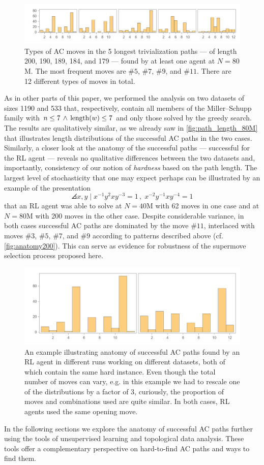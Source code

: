 \begin{figure}[h]
    \centering
	\includegraphics[scale=0.6]{fig/anatomy_some.png}
	\caption{Types of AC moves in the 5 longest trivialization paths --- of length 200, 190, 189, 184, and 179 --- found by at least one agent at $N=80$M. The most frequent moves are $\# 5$, $\# 7$, $\# 9$, and $\# 11$. There are 12 different types of moves in total.}
	\label{fig:anatomy_some}
\end{figure}

As in other parts of this paper, we performed the analysis on two datasets of sizes 1190 and 533 that, respectively, contain all members of the Miller–Schupp family with $n \leq 7 \, \land \, \operatorname{length}(w) \leq 7$ and only those solved by the greedy search. The results are qualitatively similar, as we already saw in \autoref{fig:path_length_80M} that illustrates length distributions of the successful AC paths in the two cases. Similarly, a closer look at the anatomy of the successful paths --- successful for the RL agent --- reveals no qualitative differences between the two datasets and, importantly, consistency of our notion of \textit{hardness} based on the path length. The largest level of stochasticity that one may expect perhaps can be illustrated by an example of the presentation
\[
\angles{x, y \mid x^{-1} y^2 x y^{-3} =1 \,, \; x^{-2} y^{-1} x y^{-4} =1 }
\]
that an RL agent was able to solve at $N=40$M with 62 moves in one case and at $N=80$M with 200 moves in the other case. Despite considerable variance, in both cases successful AC paths are dominated by the move $\# 11$, interlaced with moves $\# 3$, $\# 5$, $\# 7$, and $\# 9$ according to patterns described above (cf. \autoref{fig:anatomy200}). This can serve as evidence for robustness of the supermove selection process proposed here.

\begin{figure}[h]
    \centering
	\includegraphics[scale=0.55]{fig/anatomy200.png}
	\caption{An example illustrating anatomy of successful AC paths found by an RL agent in different runs working on different datasets, both of which contain the same hard instance. Even though the total number of moves can vary, e.g. in this example we had to rescale one of the distributions by a factor of 3, curiously, the proportion of moves and combinations used are quite similar. In both cases, RL agents used the same opening move.}
	\label{fig:anatomy200}
\end{figure}

In the following sections we explore the anatomy of successful AC paths further using the tools of unsupervised learning and topological data analysis. These tools offer a complementary perspective on hard-to-find AC paths and ways to find them.

